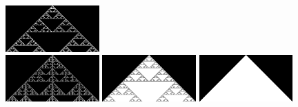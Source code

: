 \documentclass{article}
\begin{document}
\begin{figure}
    \includegraphics[width=0.32\textwidth]{ca-rules/single1/rule-126.png}\\
    \vspace{0.01\textwidth}
    \includegraphics[width=0.32\textwidth]{ca-rules/single1/rule-150.png}\hspace{0.01\textwidth}%
    \includegraphics[width=0.32\textwidth]{ca-rules/single1/rule-182.png}\hspace{0.01\textwidth}%
    \includegraphics[width=0.32\textwidth]{ca-rules/single1/rule-222-254.png}%
    \hspace{0.01\textwidth}%
    \caption{}%
    \label{fig:supplement:ca-rules-single}
\end{figure}
\end{document}
